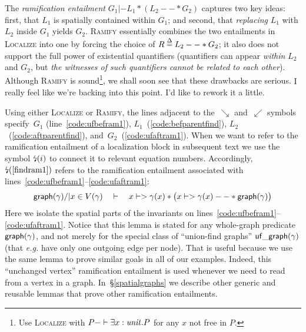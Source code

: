 {\color{magenta}The \emph{ramification entailment} $G_1 |- L_1 * (L_2 --* G_2)$ captures two key ideas: 
first, that $L_1$ is spatially contained within $G_1$; and second, that 
\emph{replacing} $L_1$ with $L_2$ inside $G_1$ yields $G_2$. \textsc{Ramify} essentially 
combines the two entailments in \textsc{Localize} into one by forcing the choice of 
$R \mathbin{\stackrel{\Delta}{=}} L_2 --* G_2$; it also does not support the full power of existential 
quantifiers (quantifiers can appear \emph{within} $L_2$ and $G_2$, but 
\emph{the witnesses of such quantifiers cannot be related to each other}).  
Although \textsc{Ramify} is sound\footnote{Use \textsc{Localize} with 
$P -|- \exists x : \mathit{unit}.P$ for any $x$ not free in $P$.}, 
we shall soon see that these drawbacks are serious.}
{\color{blue} I really feel like we're backing into this point. I'd like
to rework it a little.}

Using either \textsc{Localize} or \textsc{Ramify}, the lines adjacent to 
the~$\searrow$ and~$\swarrow$ symbols specify~$G_1$ (line~\ref{code:ufbefram1}), 
$L_1$~(\ref{code:befparentfind}),
$L_2$~(\ref{code:aftparentfind}), and~$G_2$~(\ref{code:ufaftram1}). 
When we want to refer to the ramification entailment of a localization block in 
subsequent text we use the symbol $\mbox{\lightning}(i)$ to connect it to relevant equation 
numbers.  Accordingly, $\mbox{\lightning}(\ref{findram1})$ refers to the ramification entailment 
associated with lines~\ref{code:ufbefram1}--\ref{code:ufaftram1}:
\begin{equation}
\label{findram1}
\mathsf{graph}(\gamma) /| x \in V(\gamma) \quad |- \quad x |-> \gamma(x) * \big(x |-> \gamma(x) --* \mathsf{graph}(\gamma)\big)
\end{equation}
Here we isolate the spatial parts of the invariants on lines~\ref{code:ufbefram1}--\ref{code:ufaftram1}.  Notice that this lemma is stated for any whole-graph predicate $\mathsf{graph}(\gamma)$, and not merely for the special class of ``union-find graphs'' $\mathsf{uf\_graph}(\gamma)$ (that \emph{e.g.} have only one outgoing edge per node).  That is useful because we use the same lemma to prove similar goals in all of our examples.
Indeed, this ``unchanged vertex'' ramification entailment is used whenever we need to read from a vertex in a graph.  In~\S\ref{spatialgraphs} we describe other generic and reusable lemmas that prove other ramification entailments.

